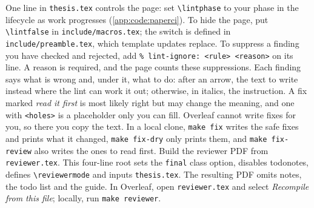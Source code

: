 One line in \texttt{thesis.tex} controls the page: set \texttt{\textbackslash lintphase} to your phase in the lifecycle as work progresses (\cref{app:code:paperci}). To hide the page, put \texttt{\textbackslash lintfalse} in \texttt{include/macros.tex}; the switch is defined in \texttt{include/preamble.tex}, which template updates replace. To suppress a finding you have checked and rejected, add \texttt{\% lint-ignore: <rule> <reason>} on its line. A reason is required, and the page counts these suppressions.
Each finding says what is wrong and, under it, what to do: after an arrow, the text to write instead where the lint can work it out; otherwise, in italics, the instruction. A fix marked \emph{read it first} is most likely right but may change the meaning, and one with \texttt{<holes>} is a placeholder only you can fill. Overleaf cannot write fixes for you, so there you copy the text. In a local clone, \texttt{make fix} writes the safe fixes and prints what it changed, \texttt{make fix-dry} only prints them, and \texttt{make fix-review} also writes the ones to read first.
Build the reviewer PDF from \texttt{reviewer.tex}. This four-line root sets the \texttt{final} class option, disables todonotes, defines \texttt{\textbackslash reviewermode} and inputs \texttt{thesis.tex}. The resulting PDF omits notes, the todo list and the guide. In Overleaf, open \texttt{reviewer.tex} and select \emph{Recompile from this file}; locally, run \texttt{make reviewer}.


